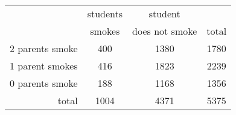 \documentclass[a4paper,11pt]{article}
\begin{document}
 
\begin{table}[htbp]
\begin{center}
\begin{tabular}{r|c c|c}
  & students & student &   \\
  & smokes & does not smoke & total \\
\hline
2 parents smoke & 400 & 1380 & 1780 \\
1 parent smokes & 416 & 1823 & 2239 \\
0 parents smoke & 188 & 1168 & 1356 \\
\hline
total & 1004 & 4371 & 5375
\end{tabular}
\end{center}
\end{table}
 
\end{document}
